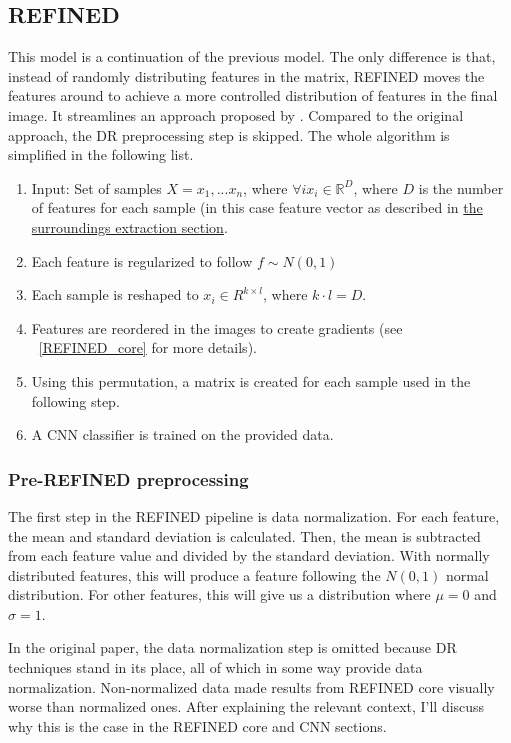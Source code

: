 \subsection{REFINED}

This model is a continuation of the previous model. The only difference is that, instead of randomly distributing features in the matrix, REFINED moves the features around to achieve a more controlled distribution of features in the final image. It streamlines an approach proposed by \cite{REFINED}. Compared to the original approach, the DR preprocessing step is skipped. The whole algorithm is simplified in the following list. 

\begin{enumerate}
    \item Input: Set of samples $X = x_1, ... x_n$, where $\forall i x_i \in \mathbb{R}^{D}$, where $D$ is the number of features for each sample (in this case feature vector as described in \hyperref[Surroundings]{the surroundings extraction section}.
    \item Each feature is regularized to follow $f \sim N(0,1)$
    \item Each sample is reshaped to $x_i \in R^{k\times l}$, where $k\cdot l = D$.
    \item Features are reordered in the images to create gradients (see ~\ref{REFINED_core} for more details).
    \item Using this permutation, a matrix is created for each sample used in the following step.
    \item A CNN classifier is trained on the provided data.
\end{enumerate}

\subsubsection{Pre-REFINED preprocessing}

The first step in the REFINED pipeline is data normalization. For each feature, the mean and standard deviation is calculated. Then, the mean is subtracted from each feature value and divided by the standard deviation. With normally distributed features, this will produce a feature following the $N(0,1)$ normal distribution. For other features, this will give us a distribution where $\mu=0$ and $\sigma=1$. 

In the original paper, the data normalization step is omitted because DR techniques stand in its place, all of which in some way provide data normalization. Non-normalized data made results from REFINED core visually worse than normalized ones. After explaining the relevant context, I'll discuss why this is the case in the REFINED core and CNN sections.

